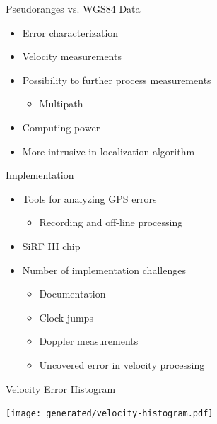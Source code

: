 \documentclass[utf8,12pt]{beamer}
\begin{document}
\begin{frame}{Pseudoranges vs. WGS84 Data}
    \begin{itemize}
        \item Error characterization
        \item Velocity measurements
        \item Possibility to further process measurements
        \begin{itemize}
            \item Multipath
        \end{itemize}
    \end{itemize}
    \vspace{0.5cm}
    \begin{itemize}
        \item Computing power
        \item More intrusive in localization algorithm
    \end{itemize}
\end{frame}

\begin{frame}{Implementation}
    \begin{itemize}
        \item Tools for analyzing GPS errors
        \begin{itemize}
            \item Recording and off-line processing
        \end{itemize}
        \item SiRF III chip
        \item Number of implementation challenges
        \begin{itemize}
            \item Documentation
            \item Clock jumps
            \item Doppler measurements
            \item Uncovered error in velocity processing
        \end{itemize}
    \end{itemize}
\end{frame}

\begin{frame}[plain]{Velocity Error Histogram}
\begin{center}
\centerline{\texttt{[image: generated/velocity-histogram.pdf]}}
\end{center}
\end{frame}
\end{document}
